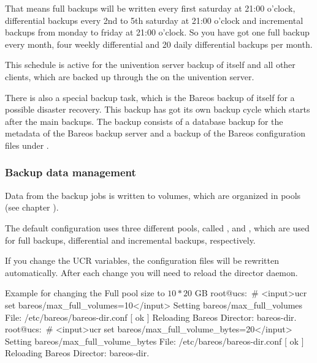 That means full backups will be written every first saturday at 21:00 o'clock, differential backups every 2nd to 5th saturday at 21:00 o'clock and incremental backups from monday to friday at 21:00 o'clock. So you have got one full backup every month, four weekly differential and 20 daily differential backups per month.

This schedule is active for the univention server backup of itself and all other clients, which are backed up through the  on the univention server.

There is also a special backup task, which is the Bareos backup of itself for a possible disaster recovery. This backup has got its own backup cycle which starts after the main backups. The backup consists of a database backup for the metadata of the Bareos backup server and a backup of the Bareos configuration files under .



\subsubsection{Backup data management}

Data from the backup jobs is written to volumes, which are organized in pools (see chapter ).

The default configuration uses three different pools, called ,  and ,
which are used for full backups, differential and incremental backups, respectively.

% 

If you change the UCR variables, the configuration files will be rewritten automatically. After each change you will need to reload the director daemon.

\begin{commands}{Example for changing the Full pool size to $10 \ast 20$ GB}
root@ucs:~# <input>ucr set bareos/max_full_volumes=10</input>
Setting bareos/max_full_volumes
File: /etc/bareos/bareos-dir.conf
[ ok ] Reloading Bareos Director: bareos-dir.
root@ucs:~# <input>ucr set bareos/max_full_volume_bytes=20</input>
Setting bareos/max_full_volume_bytes
File: /etc/bareos/bareos-dir.conf
[ ok ] Reloading Bareos Director: bareos-dir.
\end{commands}

